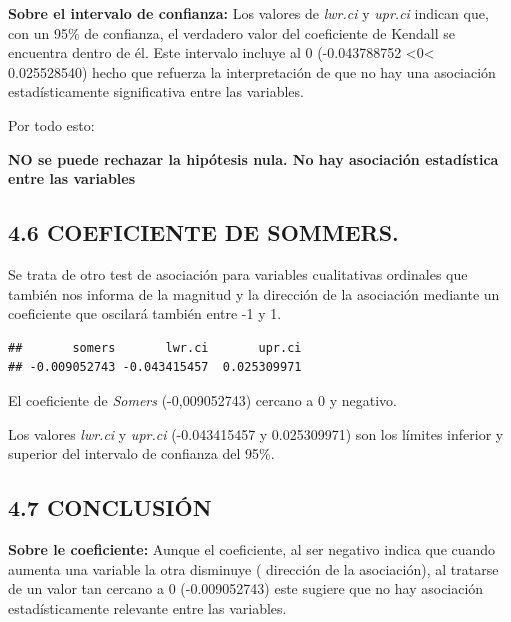 \documentclass[
  12 pt,
  a4paper,
]{article}
\newenvironment{Shaded}{\begin{snugshade}}{\end{snugshade}}
\newcommand{\AttributeTok}[1]{\textcolor[rgb]{0.13,0.29,0.53}{#1}}
\newcommand{\FloatTok}[1]{\textcolor[rgb]{0.00,0.00,0.81}{#1}}
\newcommand{\FunctionTok}[1]{\textcolor[rgb]{0.13,0.29,0.53}{\textbf{#1}}}
\newcommand{\NormalTok}[1]{#1}
\newcommand{\OtherTok}[1]{\textcolor[rgb]{0.56,0.35,0.01}{#1}}
\newcommand{\SpecialCharTok}[1]{\textcolor[rgb]{0.81,0.36,0.00}{\textbf{#1}}}
\begin{document}
\textbf{Sobre el intervalo de confianza:} Los valores de \emph{lwr.ci} y
\emph{upr.ci} indican que, con un 95\% de confianza, el verdadero valor
del coeficiente de Kendall se encuentra dentro de él. Este intervalo
incluye al 0 (-0.043788752 \textless0\textless{} 0.025528540) hecho que
refuerza la interpretación de que no hay una asociación estadísticamente
significativa entre las variables.

Por todo esto:

\textbf{NO se puede rechazar la hipótesis nula. No hay asociación
estadística entre las variables}

\subsection{4.6 COEFICIENTE DE SOMMERS.}\label{coeficiente-de-sommers.}

Se trata de otro test de asociación para variables cualitativas
ordinales que también nos informa de la magnitud y la dirección de la
asociación mediante un coeficiente que oscilará también entre -1 y 1.

\begin{Shaded}
\end{Shaded}

\begin{verbatim}
##       somers       lwr.ci       upr.ci 
## -0.009052743 -0.043415457  0.025309971
\end{verbatim}

El coeficiente de \emph{Somers} (-0,009052743) cercano a 0 y negativo.

Los valores \emph{lwr.ci} y \emph{upr.ci} (-0.043415457 y 0.025309971)
son los límites inferior y superior del intervalo de confianza del 95\%.

\subsection{4.7 CONCLUSIÓN}\label{conclusiuxf3n-3}

\textbf{Sobre le coeficiente:} Aunque el coeficiente, al ser negativo
indica que cuando aumenta una variable la otra disminuye ( dirección de
la asociación), al tratarse de un valor tan cercano a 0 (-0.009052743)
este sugiere que no hay asociación estadísticamente relevante entre las
variables.
\end{document}

